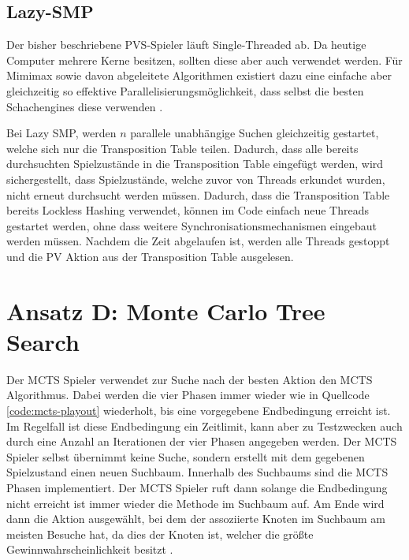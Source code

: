 \pagebreak

\subsection{Lazy-SMP}

Der bisher beschriebene \ac{PVS}-Spieler läuft Single-Threaded ab. Da heutige Computer mehrere Kerne besitzen, sollten diese aber auch verwendet werden. Für Mimimax sowie davon abgeleitete Algorithmen existiert dazu eine einfache aber gleichzeitig so effektive Parallelisierungsmöglichkeit, dass selbst die besten Schachengines diese verwenden \cite{2016.Stockfish7} \cite[S. ]{2016.ParallelChessEngine}.

Bei Lazy \ac{SMP}, werden $n$ parallele unabhängige Suchen gleichzeitig gestartet, welche sich nur die Transposition Table teilen. Dadurch, dass alle bereits durchsuchten Spielzustände in die Transposition Table eingefügt werden, wird sichergestellt, dass Spielzustände, welche zuvor von Threads erkundet wurden, nicht erneut durchsucht werden müssen. Dadurch, dass die Transposition Table bereits Lockless Hashing verwendet, können im Code einfach neue Threads gestartet werden, ohne dass weitere Synchronisationsmechanismen eingebaut werden müssen. Nachdem die Zeit abgelaufen ist, werden alle Threads gestoppt und die \ac{PV} Aktion aus der Transposition Table ausgelesen.

\pagebreak

\section{Ansatz D: Monte Carlo Tree Search}
\label{section:erstellung-ansatz-c}

Der \ac{MCTS} Spieler verwendet zur Suche nach der besten Aktion den \acl{MCTS} Algorithmus. Dabei werden die vier Phasen immer wieder wie in Quellcode \ref{code:mcts-playout} wiederholt, bis eine vorgegebene Endbedingung erreicht ist. Im Regelfall ist diese Endbedingung ein Zeitlimit, kann aber zu Testzwecken auch durch eine Anzahl an Iterationen der vier Phasen angegeben werden. Der \ac{MCTS} Spieler selbst übernimmt keine Suche, sondern erstellt mit dem gegebenen Spielzustand einen neuen Suchbaum. Innerhalb des Suchbaums sind die \ac{MCTS} Phasen implementiert. Der \ac{MCTS} Spieler ruft dann solange die Endbedingung nicht erreicht ist immer wieder die  Methode im Suchbaum auf. Am Ende wird dann die Aktion ausgewählt, bei dem der assoziierte Knoten im Suchbaum am meisten Besuche hat, da dies der Knoten ist, welcher die größte Gewinnwahrscheinlichkeit besitzt \cite[S. 217]{2008.MCTS}.

